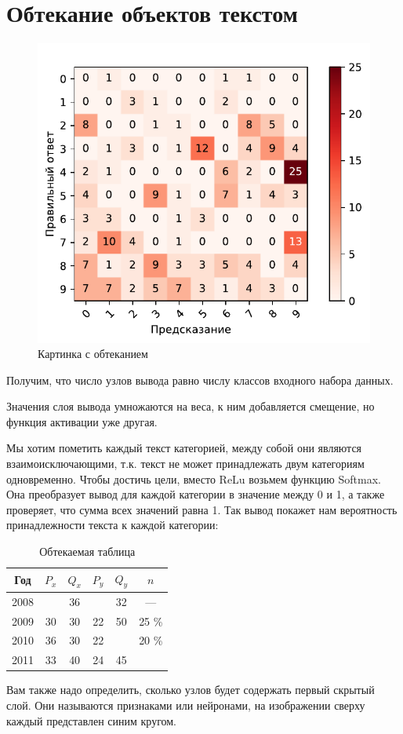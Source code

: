 \documentclass[a4paper, 12pt]{article}
\begin{document}
\section{Обтекание объектов текстом}
\begin{figure}
    \includegraphics[width=\linewidth]{../conf_matrix_experiment_4.pdf}
    \caption{Картинка с обтеканием}
\end{figure}
Получим, что число узлов вывода равно числу классов входного набора данных.

Значения слоя вывода умножаются на веса, к ним добавляется смещение, но функция активации уже другая.

Мы хотим пометить каждый текст категорией, между собой они являются взаимоисключающими, т.к. текст не может принадлежать двум категориям одновременно. Чтобы достичь цели, вместо ReLu возьмем функцию Softmax. Она преобразует вывод для каждой категории в значение между 0 и 1, а также проверяет, что сумма всех значений равна 1. Так вывод покажет нам вероятность принадлежности текста к каждой категории:

\begin{table}
    \begin{tabular}{|c|c|c|c|c|c|}
        \hline
        Год & $P_x$ &$Q_x$ & $P_y$ & $Q_y$ & $n$\\ \hline
        2008 &  & 36 &  & 32 & — \\ \hline
        2009 & 30 & 30 & 22 & 50 & 25 \% \\ \hline
        2010 & 36 & 30 & 22 &  & 20 \% \\ \hline
        2011 & 33 & 40 & 24 & 45 & \\ \hline
    \end{tabular}
    \caption{Обтекаемая таблица}
\end{table}
Вам также надо определить, сколько узлов будет содержать первый скрытый слой. Они называются признаками или нейронами, на изображении сверху каждый представлен синим кругом.
\end{document}
